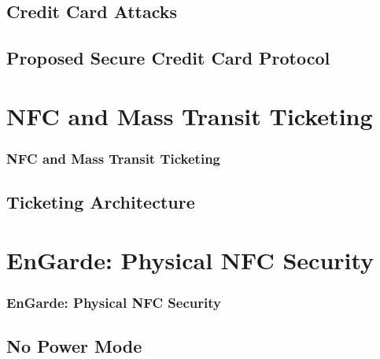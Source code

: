 \documentclass[unknownkeysallowed]{beamer}
\begin{document}
\subsection{Credit Card Attacks}
\subsection{Proposed Secure Credit Card Protocol}

\section{NFC and Mass Transit Ticketing}
\begin{frame}
\frametitle{NFC and Mass Transit Ticketing}
\begin{center}\begin{minipage}{.9\textwidth}
\tableofcontents[currentsubsection, hideothersubsections, sectionstyle=show/shaded]
\end{minipage}\end{center}
\end{frame}
%

\subsection{Ticketing Architecture}


\section{EnGarde: Physical NFC Security}
\begin{frame}
\frametitle{EnGarde: Physical NFC Security}
\begin{center}\begin{minipage}{.9\textwidth}
\tableofcontents[currentsubsection, hideothersubsections, sectionstyle=show/shaded]
\end{minipage}\end{center}
\end{frame}
%

\subsection{No Power Mode}
\end{document}
